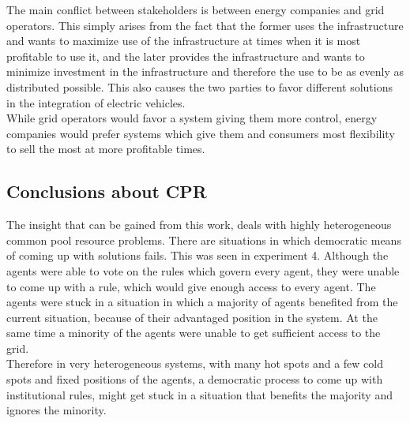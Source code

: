 \documentclass[a4paper]{article}
\begin{document}
The main conflict between stakeholders is between energy companies and grid operators. This simply arises from the 
fact that the former uses the infrastructure and wants to maximize use of the infrastructure at times when it is 
most profitable to use it, and the later provides the infrastructure and wants to minimize investment in the infrastructure
and therefore the use to be as evenly as distributed possible. This also causes the two parties to favor 
different solutions in the integration of electric vehicles. \\
While grid operators would favor a system giving them more control, energy companies would prefer systems which give 
them and consumers most flexibility to sell the most at more profitable times. 

\subsection{Conclusions about CPR}
The insight that can be gained from this work, deals with highly heterogeneous common pool resource problems. 
There are situations in which democratic means of coming up with solutions fails. This was seen in experiment 4. 
Although the agents were able to vote on the rules which govern every agent, they were unable to come up with a
rule, which would give enough access to every agent. The agents were stuck in a situation in which a majority of 
agents benefited from the current situation, because of their advantaged position in the system. At the same time 
a minority of the agents were unable to get sufficient access to the grid.\\
Therefore in very heterogeneous systems, with many hot spots and a few cold spots and fixed positions of the agents, 
a democratic process to come up with institutional rules, might get stuck in a situation that benefits the majority and 
ignores the minority. 
\end{document}
